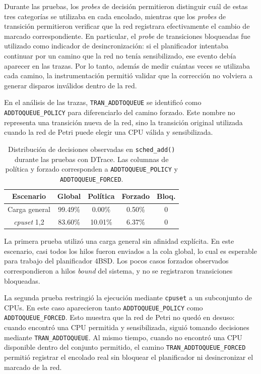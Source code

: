 Durante las pruebas, los \textit{probes} de decisión permitieron distinguir cuál de estas tres categorías se utilizaba en cada encolado, mientras que los \textit{probes} de transición permitieron verificar que la red registrara efectivamente el cambio de marcado correspondiente. En particular, el \textit{probe} de transiciones bloqueadas fue utilizado como indicador de desincronización: si el planificador intentaba continuar por un camino que la red no tenía sensibilizado, ese evento debía aparecer en las trazas. Por lo tanto, además de medir cuántas veces se utilizaba cada camino, la instrumentación permitió validar que la corrección no volviera a generar disparos inválidos dentro de la red.\par

En el análisis de las trazas, \verb|TRAN_ADDTOQUEUE| se identificó como \texttt{ADDTOQUEUE\_POLICY} para diferenciarlo del camino forzado. Este nombre no representa una transición nueva de la red, sino la transición original utilizada cuando la red de Petri puede elegir una CPU válida y sensibilizada.\par

\begin{table}[H]
    \centering
    \begin{tabular}{|c|c|c|c|c|}
        \hline
        \textbf{Escenario} & \textbf{Global} & \textbf{Política} & \textbf{Forzado} & \textbf{Bloq.} \\
        \hline
        Carga general & 99.49\% & 0.00\% & 0.50\% & 0 \\
        \hline
        \textit{cpuset} 1,2 & 83.60\% & 10.01\% & 6.37\% & 0 \\
        \hline
    \end{tabular}
    \caption[Distribución de decisiones de encolado]{Distribución de decisiones observadas en \texttt{sched\_add()} durante las pruebas con DTrace. Las columnas de política y forzado corresponden a \texttt{ADDTOQUEUE\_POLICY} y \texttt{ADDTOQUEUE\_FORCED}.}
    \label{tabla:addtoqueue-forced-dtrace}
\end{table}

La primera prueba utilizó una carga general sin afinidad explícita. En este escenario, casi todos los hilos fueron enviados a la cola global, lo cual es esperable para trabajo del planificador 4BSD. Los pocos casos forzados observados correspondieron a hilos \textit{bound} del sistema, y no se registraron transiciones bloqueadas.\par

La segunda prueba restringió la ejecución mediante \verb|cpuset| a un subconjunto de CPUs. En este caso aparecieron tanto \texttt{ADDTOQUEUE\_POLICY} como \texttt{ADDTOQUEUE\_FORCED}. Esto muestra que la red de Petri no quedó en desuso: cuando encontró una CPU permitida y sensibilizada, siguió tomando decisiones mediante \verb|TRAN_ADDTOQUEUE|. Al mismo tiempo, cuando no encontró una CPU disponible dentro del conjunto permitido, el camino \verb|TRAN_ADDTOQUEUE_FORCED| permitió registrar el encolado real sin bloquear el planificador ni desincronizar el marcado de la red.\par

